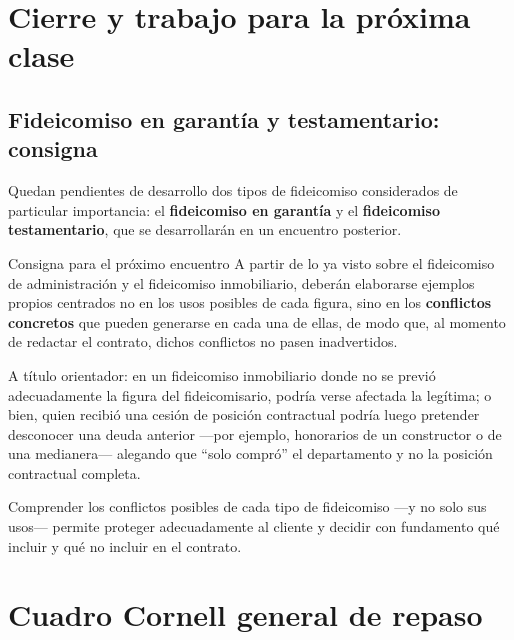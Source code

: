 \documentclass[12pt,oneside]{book}
\begin{document}
\chapter{Cierre y trabajo para la próxima clase}

\section{Fideicomiso en garantía y testamentario: consigna}

Quedan pendientes de desarrollo dos tipos de fideicomiso considerados de particular importancia: el \textbf{fideicomiso en garantía} y el \textbf{fideicomiso testamentario}, que se desarrollarán en un encuentro posterior.

\begin{exercise}{Consigna para el próximo encuentro}
A partir de lo ya visto sobre el fideicomiso de administración y el fideicomiso inmobiliario, deberán elaborarse ejemplos propios centrados no en los usos posibles de cada figura, sino en los \textbf{conflictos concretos} que pueden generarse en cada una de ellas, de modo que, al momento de redactar el contrato, dichos conflictos no pasen inadvertidos.

A título orientador: en un fideicomiso inmobiliario donde no se previó adecuadamente la figura del fideicomisario, podría verse afectada la legítima; o bien, quien recibió una cesión de posición contractual podría luego pretender desconocer una deuda anterior —por ejemplo, honorarios de un constructor o de una medianera— alegando que ``solo compró'' el departamento y no la posición contractual completa.
\end{exercise}

\begin{important}
Comprender los conflictos posibles de cada tipo de fideicomiso —y no solo sus usos— permite proteger adecuadamente al cliente y decidir con fundamento qué incluir y qué no incluir en el contrato.
\end{important}

\chapter{Cuadro Cornell general de repaso}
\end{document}
